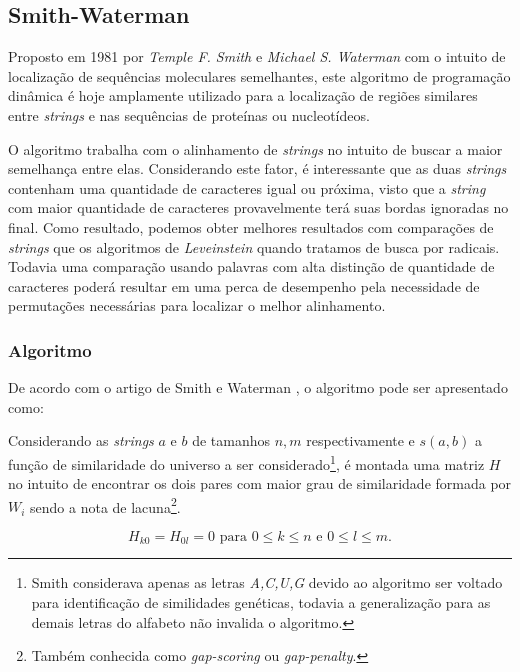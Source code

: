 \subsection{Smith-Waterman} %
\label{sec:smith_waterman}


Proposto em 1981 por \textit{Temple F. Smith} e \textit{Michael S. Waterman}\cite{smith1981identification} com o intuito de localização de sequências moleculares semelhantes, este algoritmo de programação dinâmica é hoje amplamente utilizado para a localização de regiões similares entre \textit{strings} e nas sequências de proteínas ou nucleotídeos.

O algoritmo trabalha com o alinhamento de \textit{strings} no intuito de  buscar a maior semelhança entre elas. Considerando este fator, é interessante que as duas \textit{strings} contenham uma quantidade de caracteres igual ou próxima, visto que  a \textit{string} com  maior quantidade de caracteres provavelmente terá suas bordas ignoradas no final. Como resultado, podemos obter melhores resultados com comparações de \textit{strings} que os algoritmos de \textit{Leveinstein} quando tratamos de busca por radicais. Todavia uma comparação usando palavras com alta distinção de quantidade de caracteres poderá resultar em uma perca de desempenho pela necessidade de permutações necessárias para localizar o melhor alinhamento.

\subsubsection{Algoritmo} %
\label{sub:algoritmo}

De acordo com o artigo de Smith e Waterman \cite{smith1981identification}, o algoritmo pode ser apresentado como:

Considerando as \textit{strings} $a$ e $b$ de tamanhos $n,m$ respectivamente e $s(a,b)$ a função de similaridade do universo a ser considerado\footnote{Smith considerava apenas as letras \textit{A,C,U,G} devido ao algoritmo ser voltado para identificação de similidades genéticas, todavia a generalização para as demais letras do alfabeto não invalida o algoritmo.}, é montada uma matriz $H$  no intuito de encontrar os dois pares com maior grau de similaridade formada por $W_i$ sendo a nota de lacuna\footnote{Também conhecida como \textit{gap-scoring} ou \textit{gap-penalty}.}.

\begin{equation*}
	H_{k0} = H_{0l} = 0 \text{ para } 0\leq k \leq n \text{ e } 0\leq l \leq m.
\end{equation*}

